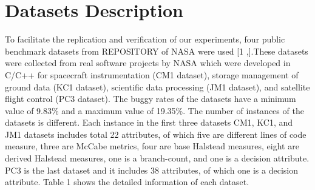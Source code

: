 \documentclass[runningheads,a4paper]{llncs}
\begin{document}
\section{Datasets Description}
\label{data}


To facilitate the replication and verification of our experiments, four public benchmark datasets from REPOSITORY of NASA were used [1 ,].These datasets were collected from real software projects by NASA which were developed in C/C++ for spacecraft instrumentation (CM1 dataset), storage management of ground data (KC1 dataset), scientific data processing (JM1 dataset), and satellite flight control (PC3 dataset). The buggy rates of the datasets have a minimum value of 9.83\% and a maximum value of 19.35\%. The number of instances of the datasets is different. Each instance in the first three datasets CM1, KC1, and JM1 datasets includes total 22 attributes, of which five are different lines of code measure, three are McCabe metrics, four are base Halstead measures, eight are derived Halstead measures, one is a branch-count, and one is a decision attribute. PC3 is the last dataset and it includes 38 attributes, of which one is a decision attribute. Table 1 shows the detailed information of each dataset.


\begin{table}
\caption{Datasets Description}
\begin{centering}
\par\end{centering}

\end{table}
\end{document}
